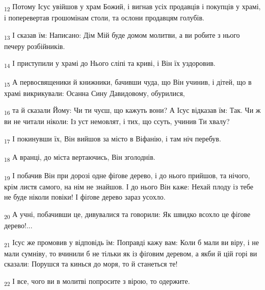 \begin{tcolorbox}
\textsubscript{12} Потому Ісус увійшов у храм Божий, і вигнав усіх продавців і покупців у храмі, і поперевертав грошомінам столи, та ослони продавцям голубів.
\end{tcolorbox}
\begin{tcolorbox}
\textsubscript{13} І сказав їм: Написано: Дім Мій буде домом молитви, а ви робите з нього печеру розбійників.
\end{tcolorbox}
\begin{tcolorbox}
\textsubscript{14} І приступили у храмі до Нього сліпі та криві, і Він їх уздоровив.
\end{tcolorbox}
\begin{tcolorbox}
\textsubscript{15} А первосвященики й книжники, бачивши чуда, що Він учинив, і дітей, що в храмі викрикували: Осанна Сину Давидовому, обурилися,
\end{tcolorbox}
\begin{tcolorbox}
\textsubscript{16} та й сказали Йому: Чи ти чуєш, що кажуть вони? А Ісус відказав їм: Так. Чи ж ви не читали ніколи: Із уст немовлят, і тих, що ссуть, учинив Ти хвалу?
\end{tcolorbox}
\begin{tcolorbox}
\textsubscript{17} І покинувши їх, Він вийшов за місто в Віфанію, і там ніч перебув.
\end{tcolorbox}
\begin{tcolorbox}
\textsubscript{18} А вранці, до міста вертаючись, Він зголоднів.
\end{tcolorbox}
\begin{tcolorbox}
\textsubscript{19} І побачив Він при дорозі одне фіґове дерево, і до нього прийшов, та нічого, крім листя самого, на нім не знайшов. І до нього Він каже: Нехай плоду із тебе не буде ніколи повіки! І фіґове дерево зараз усохло.
\end{tcolorbox}
\begin{tcolorbox}
\textsubscript{20} А учні, побачивши це, дивувалися та говорили: Як швидко всохло це фіґове дерево!...
\end{tcolorbox}
\begin{tcolorbox}
\textsubscript{21} Ісус же промовив у відповідь їм: Поправді кажу вам: Коли б мали ви віру, і не мали сумніву, то вчинили б не тільки як із фіґовим деревом, а якби й цій горі ви сказали: Порушся та кинься до моря, то й станеться те!
\end{tcolorbox}
\begin{tcolorbox}
\textsubscript{22} І все, чого ви в молитві попросите з вірою, то одержите.
\end{tcolorbox}
